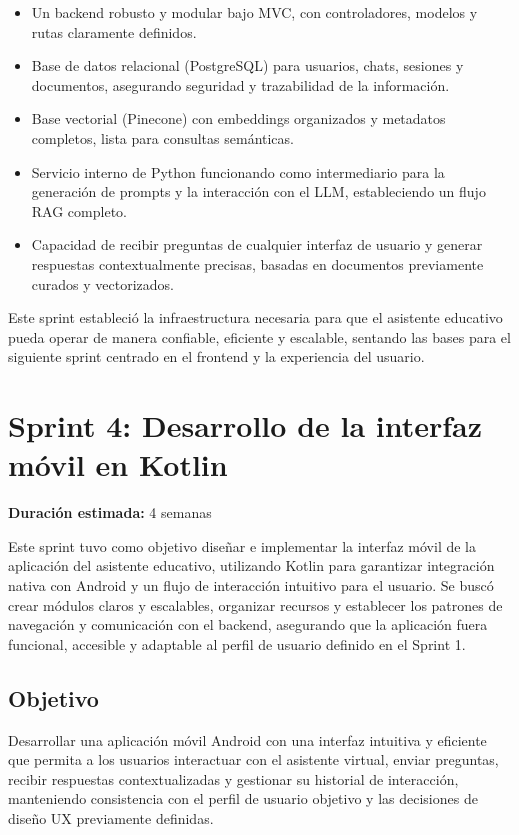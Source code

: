 \begin{itemize}
      \item Un backend robusto y modular bajo MVC, con controladores, modelos y rutas
            claramente definidos.
      \item Base de datos relacional (PostgreSQL) para usuarios, chats, sesiones y
            documentos, asegurando seguridad y trazabilidad de la información.
      \item Base vectorial (Pinecone) con embeddings organizados y metadatos completos,
            lista para consultas semánticas.
      \item Servicio interno de Python funcionando como intermediario para la generación de
            prompts y la interacción con el LLM, estableciendo un flujo RAG completo.
      \item Capacidad de recibir preguntas de cualquier interfaz de usuario y generar
            respuestas contextualmente precisas, basadas en documentos previamente curados
            y vectorizados.
\end{itemize}

Este sprint estableció la infraestructura necesaria para que el asistente
educativo pueda operar de manera confiable, eficiente y escalable, sentando las
bases para el siguiente sprint centrado en el frontend y la experiencia del
usuario.

\section{Sprint 4: Desarrollo de la interfaz móvil en Kotlin}
\textbf{Duración estimada:} 4 semanas

Este sprint tuvo como objetivo diseñar e implementar la interfaz móvil de la
aplicación del asistente educativo, utilizando Kotlin para garantizar
integración nativa con Android y un flujo de interacción intuitivo para el
usuario. Se buscó crear módulos claros y escalables, organizar recursos y
establecer los patrones de navegación y comunicación con el backend, asegurando
que la aplicación fuera funcional, accesible y adaptable al perfil de usuario
definido en el Sprint 1.

\subsection{Objetivo}
Desarrollar una aplicación móvil Android con una interfaz intuitiva y eficiente
que permita a los usuarios interactuar con el asistente virtual, enviar
preguntas, recibir respuestas contextualizadas y gestionar su historial de
interacción, manteniendo consistencia con el perfil de usuario objetivo y las
decisiones de diseño UX previamente definidas.

